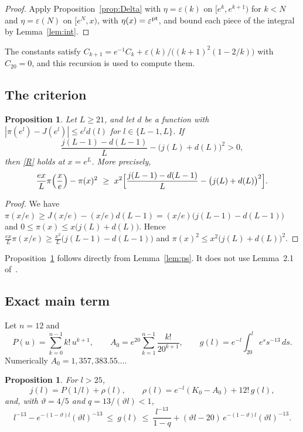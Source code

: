 \documentclass{amsart}
\newtheorem{proposition}[theorem]{Proposition}
\theoremstyle{definition}
\theoremstyle{remark}
\theoremstyle{plain}
\numberwithin{equation}{section}
\newcommand{\eps}{\varepsilon}
\begin{document}
\begin{proof}
Apply Proposition~\ref{prop:Delta} with $\eta=\eps(k)$ on $[e^k,e^{k+1})$ for $k<N$ and $\eta=\eps(N)$ on $[e^N,x)$, with $\eta(x)=\eps^{\rm pt}$, and bound each piece of the integral by Lemma~\ref{lem:int}.
\end{proof}

The constants satisfy $C_{k+1}=e^{-1}C_k+\eps(k)/\bigl((k+1)^2(1-2/k)\bigr)$ with $C_{20}=0$, and this recursion is used to compute them.

\subsection{The criterion}

\begin{proposition}\label{prop:C}
Let $L\ge21$, and let $d$ be a function with $|\pi(e^l)-J(e^l)|\le e^l d(l)$ for $l\in\{L-1,L\}$. If
\begin{equation*}\label{C}
\frac{j(L-1)-d(L-1)}{L}-\bigl(j(L)+d(L)\bigr)^2>0,
\tag{C}
\end{equation*}
then \eqref{R} holds at $x=e^L$. More precisely,
\[
\frac{ex}{L}\pi\Bigl(\frac xe\Bigr)-\pi(x)^2\ \ge\ x^2\Bigl[\frac{j(L-1)-d(L-1)}{L}-\bigl(j(L)+d(L)\bigr)^2\Bigr].
\]
\end{proposition}

\begin{proof}
We have $\pi(x/e)\ge J(x/e)-(x/e)d(L-1)=(x/e)\bigl(j(L-1)-d(L-1)\bigr)$ and $0\le\pi(x)\le x\bigl(j(L)+d(L)\bigr)$. Hence $\frac{ex}{L}\pi(x/e)\ge\frac{x^2}{L}\bigl(j(L-1)-d(L-1)\bigr)$ and $\pi(x)^2\le x^2\bigl(j(L)+d(L)\bigr)^2$.
\end{proof}

Proposition~\ref{prop:C} follows directly from Lemma~\ref{lem:ps}. It does not use Lemma~2.1 of~\cite{DP15}.

\subsection{Exact main term}
Let $n=12$ and
\[
P(u)=\sum_{k=0}^{n-1}k!\,u^{k+1},\qquad A_0=e^{20}\sum_{k=1}^{n-1}\frac{k!}{20^{k+1}},\qquad g(l)=e^{-l}\int_{20}^{l}e^ss^{-13}\,ds.
\]
Numerically $A_0=1{,}357{,}383.55\ldots$.

\begin{proposition}\label{prop:rho}
For $l>25$,
\[
j(l)=P(1/l)+\rho(l),\qquad \rho(l)=e^{-l}(K_0-A_0)+12!\,g(l),
\]
and, with $\vartheta=4/5$ and $q=13/(\vartheta l)<1$,
\[
l^{-13}-e^{-(1-\vartheta)l}(\vartheta l)^{-13}\ \le\ g(l)\ \le\ \frac{l^{-13}}{1-q}+(\vartheta l-20)\,e^{-(1-\vartheta)l}(\vartheta l)^{-13}.
\]
\end{proposition}
\end{document}
